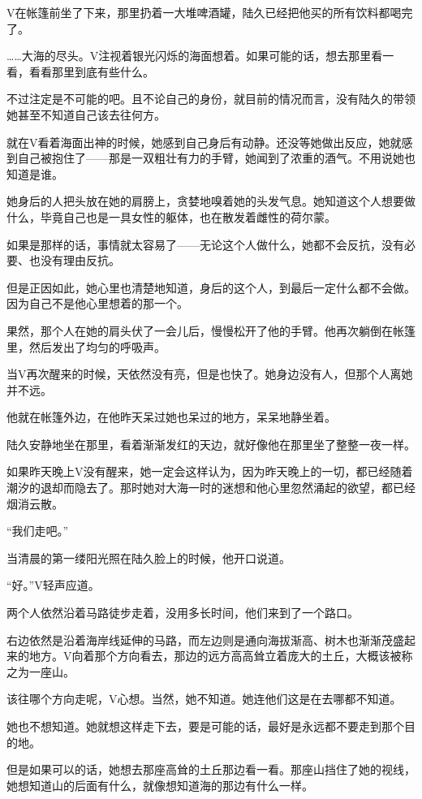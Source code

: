 V在帐篷前坐了下来，那里扔着一大堆啤酒罐，陆久已经把他买的所有饮料都喝完了。

……大海的尽头。V注视着银光闪烁的海面想着。如果可能的话，想去那里看一看，看看那里到底有些什么。

不过注定是不可能的吧。且不论自己的身份，就目前的情况而言，没有陆久的带领她甚至不知道自己该去往何方。

就在V看着海面出神的时候，她感到自己身后有动静。还没等她做出反应，她就感到自己被抱住了——那是一双粗壮有力的手臂，她闻到了浓重的酒气。不用说她也知道是谁。

她身后的人把头放在她的肩膀上，贪婪地嗅着她的头发气息。她知道这个人想要做什么，毕竟自己也是一具女性的躯体，也在散发着雌性的荷尔蒙。

如果是那样的话，事情就太容易了——无论这个人做什么，她都不会反抗，没有必要、也没有理由反抗。

但是正因如此，她心里也清楚地知道，身后的这个人，到最后一定什么都不会做。因为自己不是他心里想着的那一个。

果然，那个人在她的肩头伏了一会儿后，慢慢松开了他的手臂。他再次躺倒在帐篷里，然后发出了均匀的呼吸声。

当V再次醒来的时候，天依然没有亮，但是也快了。她身边没有人，但那个人离她并不远。

他就在帐篷外边，在他昨天呆过她也呆过的地方，呆呆地静坐着。

陆久安静地坐在那里，看着渐渐发红的天边，就好像他在那里坐了整整一夜一样。

如果昨天晚上V没有醒来，她一定会这样认为，因为昨天晚上的一切，都已经随着潮汐的退却而隐去了。那时她对大海一时的迷想和他心里忽然涌起的欲望，都已经烟消云散。

“我们走吧。”

当清晨的第一缕阳光照在陆久脸上的时候，他开口说道。

“好。”V轻声应道。

两个人依然沿着马路徒步走着，没用多长时间，他们来到了一个路口。

右边依然是沿着海岸线延伸的马路，而左边则是通向海拔渐高、树木也渐渐茂盛起来的地方。V向着那个方向看去，那边的远方高高耸立着庞大的土丘，大概该被称之为一座山。

该往哪个方向走呢，V心想。当然，她不知道。她连他们这是在去哪都不知道。

她也不想知道。她就想这样走下去，要是可能的话，最好是永远都不要走到那个目的地。

但是如果可以的话，她想去那座高耸的土丘那边看一看。那座山挡住了她的视线，她想知道山的后面有什么，就像想知道海的那边有什么一样。


